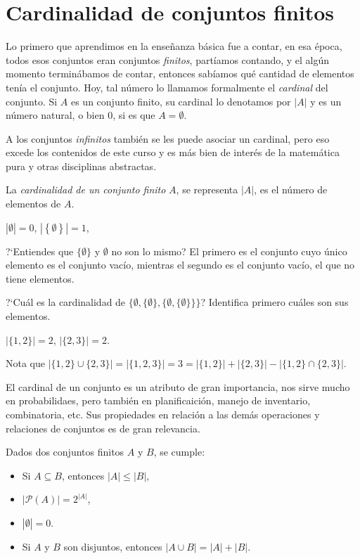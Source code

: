 \section{Cardinalidad de conjuntos finitos}

Lo primero que aprendimos en la enseñanza básica fue a contar, en esa época, todos esos conjuntos eran conjuntos \emph{finitos}, partíamos contando, y el algún momento terminábamos de contar, entonces sabíamos qué cantidad de elementos tenía el conjunto.
Hoy,  tal número lo llamamos formalmente el \emph{cardinal} del conjunto.
Si $A$ es un conjunto finito, su cardinal lo denotamos por $|A|$ y es un número natural,  o bien 0, si es que $A=\emptyset$.

A los conjuntos \emph{infinitos} también se les puede asociar un cardinal, pero eso excede los contenidos de este curso y es más bien de interés de la matemática pura y otras disciplinas abstractas.


\medskip

\begin{defn}
La {\em cardinalidad de un conjunto finito} $A$, se representa $|A|$, es el n\'umero de elementos de $A$.
\end{defn}


\medskip

\begin{ejemplo}\leavevmode 
	
	$|\emptyset| = 0$, 	
	$\left|\left\{\emptyset\right\}\right| = 1$, 
	
	?`Entiendes que
	$\{\emptyset\}$ y $\emptyset$ no son lo mismo? El primero es el conjunto
	cuyo \'unico elemento es el conjunto vac\'io, mientras el segundo es
	el conjunto vac\'io, el que no tiene elementos. 
	
	?`Cu\'al es la cardinalidad
	de $\{\emptyset, \{\emptyset\}, \{\emptyset, \{\emptyset\}\}\}$?
	Identifica primero cu\'ales son sus elementos.
	
	$|\{1,2\}| = 2$, $|\{2,3\}| = 2$.
	
	Nota que $|\{1,2\}\cup\{2,3\}| = |\{1,2,3\}| = 3 = 
	|\{1,2\}| + |\{2,3\}| - |\{1,2\}\cap \{2,3\}|$.
\end{ejemplo}

El cardinal de un conjunto es un atributo de gran importancia, nos sirve mucho en probabilidaes, pero también en planificaición, manejo de inventario, combinatoria, etc.
Sus propiedades en relación a las demás operaciones y relaciones de conjuntos es de gran relevancia.

\begin{prop}
Dados dos conjuntos finitos $A$ y $B$, se cumple:
\begin{itemize}
\item Si $A\subseteq B$, entonces $|A|\le |B|$,
\item $|\mathcal{P}(A)|=2^{|A|}$,
\item $|\emptyset|=0$.
\item Si $A$ y $B$ son disjuntos, entonces $|A\cup B|=|A|+|B|$.
\end{itemize}
\end{prop}

